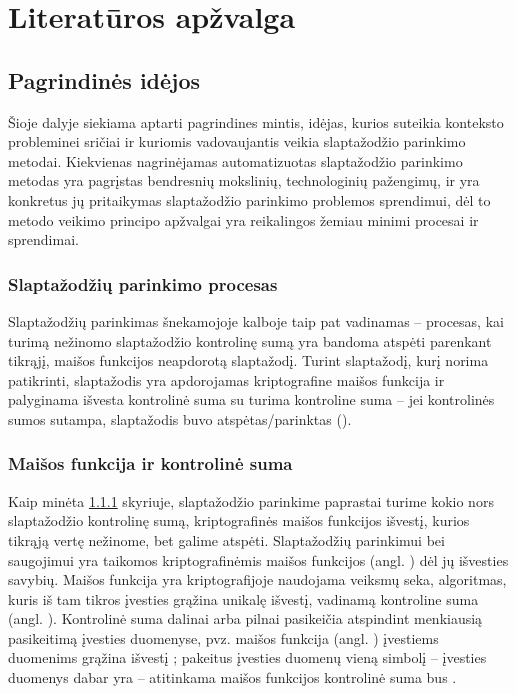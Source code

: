 \documentclass{VUMIFInfBakalaurinis}
\begin{document}
\section{Literatūros apžvalga}
\subsection{Pagrindinės idėjos}
Šioje dalyje siekiama aptarti pagrindines mintis, idėjas, kurios suteikia 
konteksto probleminei sričiai ir kuriomis vadovaujantis veikia slaptažodžio
parinkimo metodai. Kiekvienas nagrinėjamas automatizuotas slaptažodžio parinkimo 
metodas yra pagrįstas bendresnių mokslinių, technologinių pažengimų, ir yra 
konkretus jų pritaikymas slaptažodžio parinkimo problemos sprendimui, dėl to 
metodo veikimo principo apžvalgai yra reikalingos žemiau minimi procesai ir 
sprendimai.

\subsubsection{Slaptažodžių parinkimo procesas} \label{sec:cracking}
Slaptažodžių parinkimas šnekamojoje kalboje taip pat vadinamas 
 -- procesas, kai turimą nežinomo slaptažodžio 
kontrolinę sumą yra bandoma atspėti parenkant tikrąjį, maišos funkcijos 
neapdorotą slaptažodį. Turint slaptažodį, kurį norima patikrinti, slaptažodis 
yra apdorojamas kriptografine maišos funkcija ir palyginama išvesta kontrolinė 
suma su turima kontroline suma -- jei kontrolinės sumos sutampa, slaptažodis 
buvo atspėtas/parinktas ().

\subsubsection{Maišos funkcija ir kontrolinė suma} \label{sec:hashing}
Kaip minėta \ref{sec:cracking} skyriuje, slaptažodžio parinkime paprastai turime 
kokio nors slaptažodžio kontrolinę sumą, kriptografinės maišos funkcijos 
išvestį, kurios tikrąją vertę nežinome, bet galime atspėti. Slaptažodžių 
parinkimui bei saugojimui yra taikomos kriptografinėmis maišos funkcijos (angl. 
) dėl jų išvesties savybių. Maišos funkcija yra 
kriptografijoje naudojama veiksmų seka, algoritmas, kuris iš tam tikros įvesties 
grąžina unikalę išvestį, vadinamą kontroline suma (angl. ). 
Kontrolinė suma dalinai arba pilnai pasikeičia atspindint menkiausią pasikeitimą 
įvesties duomenyse, pvz. maišos funkcija  (angl. 
) įvestiems duomenims  
grąžina išvestį ; pakeitus įvesties 
duomenų vieną simbolį -- įvesties duomenys dabar yra  -- 
atitinkama  maišos funkcijos kontrolinė suma bus 
.
\end{document}
